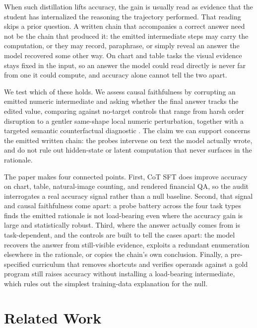 \documentclass[11pt]{article}
\begin{document}
When such distillation lifts accuracy, the gain is usually read as evidence that the student has internalized the reasoning the trajectory performed. That reading skips a prior question. A written chain that accompanies a correct answer need not be the chain that produced it: the emitted intermediate steps may carry the computation, or they may record, paraphrase, or simply reveal an answer the model recovered some other way. On chart and table tasks the visual evidence stays fixed in the input, so an answer the model could read directly is never far from one it could compute, and accuracy alone cannot tell the two apart.

We test which of these holds. We assess causal faithfulness by corrupting an emitted numeric intermediate and asking whether the final answer tracks the edited value, comparing against no-target controls that range from harsh order disruption to a gentler same-shape local numeric perturbation, together with a targeted semantic counterfactual diagnostic \citep{lanham2023}. The claim we can support concerns the emitted written chain: the probes intervene on text the model actually wrote, and do not rule out hidden-state or latent computation that never surfaces in the rationale.

The paper makes four connected points. First, CoT SFT does improve accuracy on chart, table, natural-image counting, and rendered financial QA, so the audit interrogates a real accuracy signal rather than a null baseline. Second, that signal and causal faithfulness come apart: a probe battery across the four task types finds the emitted rationale is not load-bearing even where the accuracy gain is large and statistically robust. Third, where the answer actually comes from is task-dependent, and the controls are built to tell the cases apart: the model recovers the answer from still-visible evidence, exploits a redundant enumeration elsewhere in the rationale, or copies the chain's own conclusion. Finally, a pre-specified curriculum that removes shortcuts and verifies operands against a gold program still raises accuracy without installing a load-bearing intermediate, which rules out the simplest training-data explanation for the null.

\section{Related Work}
\label{sec:related}
\end{document}
